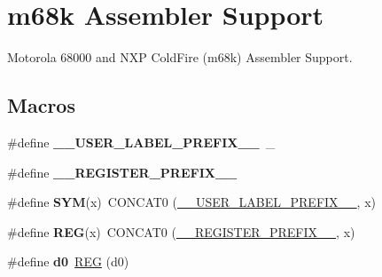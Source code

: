 \hypertarget{group__RTEMSScoreCPUm68kASM}{}\section{m68k Assembler Support}
\label{group__RTEMSScoreCPUm68kASM}


Motorola 68000 and N\+XP Cold\+Fire (m68k) Assembler Support.  


\subsection*{Macros}
\begin{DoxyCompactItemize}
\item 
\mbox{\label{group__RTEMSScoreCPUm68kASM_gaff6bf0ff0fa3b5cbd23a8ae1131c87a9}} 
\#define {\bfseries \+\_\+\+\_\+\+U\+S\+E\+R\+\_\+\+L\+A\+B\+E\+L\+\_\+\+P\+R\+E\+F\+I\+X\+\_\+\+\_\+}~\+\_\+
\item 
\mbox{\label{group__RTEMSScoreCPUm68kASM_ga08d4062230ffc8494f4be4f6447497e4}} 
\#define {\bfseries \+\_\+\+\_\+\+R\+E\+G\+I\+S\+T\+E\+R\+\_\+\+P\+R\+E\+F\+I\+X\+\_\+\+\_\+}
\item 
\mbox{\label{group__RTEMSScoreCPUm68kASM_gafe05d428a5f345f51fb591debb815325}} 
\#define {\bfseries S\+YM}(x)~C\+O\+N\+C\+A\+T0 (\mbox{\hyperlink{group__RTEMSScoreCPUx86-64ASM_gaff6bf0ff0fa3b5cbd23a8ae1131c87a9}{\+\_\+\+\_\+\+U\+S\+E\+R\+\_\+\+L\+A\+B\+E\+L\+\_\+\+P\+R\+E\+F\+I\+X\+\_\+\+\_\+}}, x)
\item 
\mbox{\label{group__RTEMSScoreCPUm68kASM_gacee196421e9a06f7700bb3064b13b37a}} 
\#define {\bfseries R\+EG}(x)~C\+O\+N\+C\+A\+T0 (\mbox{\hyperlink{group__RTEMSScoreCPUV850ASM_ga08d4062230ffc8494f4be4f6447497e4}{\+\_\+\+\_\+\+R\+E\+G\+I\+S\+T\+E\+R\+\_\+\+P\+R\+E\+F\+I\+X\+\_\+\+\_\+}}, x)
\item 
\mbox{\label{group__RTEMSScoreCPUm68kASM_gade11f3df9cc63f54fa743250c646e270}} 
\#define {\bfseries d0}~\mbox{\hyperlink{group__RTEMSScoreCPUx86-64ASM_gacee196421e9a06f7700bb3064b13b37a}{R\+EG}} (d0)
\item 
\mbox{\label{group__RTEMSScoreCPUm68kASM_ga1fe17aa2ff1722c937379044a27da68a}} 

\end{DoxyCompactItemize}

